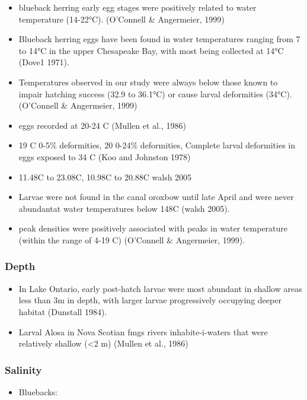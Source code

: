 \documentclass[
]{book}
\providecommand{\tightlist}{%
  \setlength{\itemsep}{0pt}\setlength{\parskip}{0pt}}
\begin{document}
\begin{itemize}
\tightlist
\item
  blueback herring early egg stages were positively related to water temperature (14-22°C). (O'Connell \& Angermeier, 1999)
\item
  Blueback herring eggs have been found in water temperatures ranging from 7 to 14°C in the upper Chesapeake Bay, with most being collected at 14°C (Dove1 1971).
\item
  Temperatures observed in our study were always below those known to impair hatching success (32.9 to 36.1°C) or cause larval deformities (34°C). (O'Connell \& Angermeier, 1999)
\item
  eggs recorded at 20-24 C (Mullen et al., 1986)
\item
  19 C 0-5\% deformities, 20 0-24\% deformities, Complete larval deformities in eggs exposed to 34 C (Koo and Johnston 1978)
\item
  11.48C to 23.08C, 10.98C to 20.88C walsh 2005
\item
  Larvae were not found in the canal oroxbow until late April and were never abundantat water temperatures below 148C (walsh 2005).
\item
  peak densities were positively associated with peaks in water temperature (within the range of 4-19 C) (O'Connell \& Angermeier, 1999).
\end{itemize}

\hypertarget{depth-5}{%
\subsubsection{Depth}\label{depth-5}}

\begin{itemize}
\tightlist
\item
  In Lake Ontario, early post-hatch larvae were most abundant in shallow areas less than 3m in depth, with larger larvae progressively occupying deeper habitat (Dunstall 1984).
\item
  Larval Alosa in Nova Scotian fmgs rivers inhabite-i-waters that were relatively shallow (\textless2 m) (Mullen et al., 1986)
\end{itemize}

\hypertarget{salinity-5}{%
\subsubsection{Salinity}\label{salinity-5}}

\begin{itemize}
\tightlist
\item
  Bluebacks:
\end{itemize}
\end{document}
